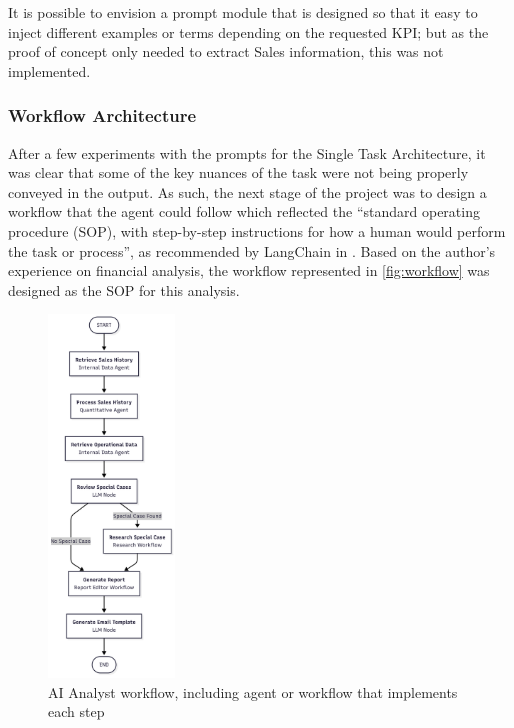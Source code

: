 \documentclass[a4paper]{report}
\begin{document}
It is possible to envision a prompt module that is designed so that it easy to inject different examples or terms depending on the requested KPI; but as the proof of concept only needed to extract Sales information, this was not implemented.

\subsubsection{Workflow Architecture}

After a few experiments with the prompts for the Single Task Architecture, it was clear that some of the key nuances of the task were not being properly conveyed in the output. As such, the next stage of the project was to design a workflow that the agent could follow which reflected the ``standard operating procedure (SOP), with step-by-step instructions for how a human would perform the task or process'', as recommended by LangChain in \cite{langchain2025buildAgent}. Based on the author's experience on financial analysis, the workflow represented in \autoref{fig:workflow} was designed as the SOP for this analysis.

\begin{figure}[h]
\centering
\includegraphics[width=0.3\textwidth]{images/workflow.png}
\caption{AI Analyst workflow, including agent or workflow that implements each step}
\label{fig:workflow}
\end{figure}
\end{document}
